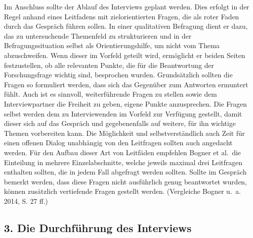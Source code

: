 \documentclass[a4paper,
fontsize=11pt,
oneside,
numbers=noperiodatend,
parskip=half-,
bibliography=totoc,
final
]{scrartcl}
\begin{document}
Im Anschluss sollte der Ablauf des Interviews geplant werden. Dies
erfolgt in der Regel anhand eines Leitfadens mit zielorientierten
Fragen, die als roter Faden durch das Gespräch führen sollen. In einer
qualitativen Befragung dient er dazu, das zu untersuchende Themenfeld zu
strukturieren und in der Befragungssituation selbst als
Orientierungshilfe, um nicht vom Thema abzuschweifen. Wenn dieser im
Vorfeld geteilt wird, ermöglicht er beiden Seiten festzustellen, ob alle
relevanten Punkte, die für die Beantwortung der Forschungsfrage wichtig
sind, besprochen wurden. Grundsätzlich sollten die Fragen so formuliert
werden, dass sich das Gegenüber zum Antworten ermuntert fühlt. Auch ist
es sinnvoll, weiterführende Fragen zu stellen sowie dem Interviewpartner
die Freiheit zu geben, eigene Punkte anzusprechen. Die Fragen selbst
werden dem zu Interviewenden im Vorfeld zur Verfügung gestellt, damit
dieser sich auf das Gespräch und gegebenenfalls auf weitere, für ihn
wichtige Themen vorbereiten kann. Die Möglichkeit und selbstverständlich
auch Zeit für einen offenen Dialog unabhängig von den Leitfragen sollten
auch angedacht werden. Für den Aufbau dieser Art von Leitfäden empfehlen
Bogner et al.~die Einteilung in mehrere Einzelabschnitte, welche jeweils
maximal drei Leitfragen enthalten sollten, die in jedem Fall abgefragt
werden sollten. Sollte im Gespräch bemerkt werden, dass diese Fragen
nicht ausführlich genug beantwortet wurden, können zusätzlich
vertiefende Fragen gestellt werden. (Vergleiche Bogner u.~a. 2014, S. 27
ff.)

\subsection{3. Die Durchführung des
Interviews}\label{die-durchfuxfchrung-des-interviews}
\end{document}
